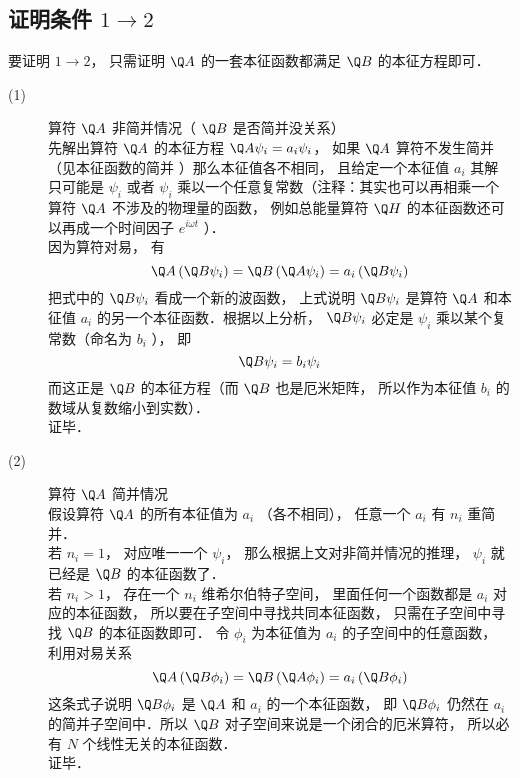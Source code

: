 \subsection{证明条件 $1 \to 2$}
要证明 $1 \to 2$，  只需证明 $\Q A$ 的一套本征函数都满足 $\Q B$ 的本征方程即可．
\begin{description}
  \item[(1)] 算符 $\Q A$ 非简并情况（ $\Q B$ 是否简并没关系）\\
  先解出算符 $\Q A$ 的本征方程 $\Q A{\psi _i} = {a_i}{\psi _i}$，  如果 $\Q A$ 算符不发生简并（见本征函数的简并%
  ）那么本征值各不相同， 且给定一个本征值 $a_i$ 其解只可能是 ${\psi _i}$ 或者 ${\psi _i}$ 乘以一个任意复常数（注释：其实也可以再相乘一个算符 $\Q A$ 不涉及的物理量的函数， 例如总能量算符 $\Q H$ 的本征函数还可以再成一个时间因子 ${e^{i\omega t}}$ ）．\\
  因为算符对易， 有
  \begin{equation}
    \Q A\left( {\Q B{\psi _i}} \right) = \Q B\left( {\Q A{\psi _i}} \right) = {a_i}\left( {\Q B{\psi _i}} \right)
  \end{equation}
  把式中的 $\Q B{\psi _i}$ 看成一个新的波函数， 上式说明 $\Q B{\psi _i}$ 是算符 $\Q A$ 和本征值 $a_i$ 的另一个本征函数．根据以上分析，  $\Q B{\psi _i}$ 必定是 ${\psi _i}$ 乘以某个复常数（命名为 $b_i$ ）， 即
  \begin{equation}
    \Q B{\psi _i} = {b_i}{\psi _i}
  \end{equation}
  而这正是 $\Q B$ 的本征方程（而 $\Q B$ 也是厄米矩阵， 所以作为本征值 $b_i$ 的数域从复数缩小到实数）．\\
  证毕．
  \item[(2)] 算符 $\Q A$ 简并情况\\
  假设算符 $\Q A$ 的所有本征值为 $a_i$ （各不相同）， 任意一个 $a_i$ 有 $n_i$ 重简并．\\
若 ${n_i} = 1$，  对应唯一一个 ${\psi _i}$，  那么根据上文对非简并情况的推理， ${\psi _i}$ 就已经是 $\Q B$ 的本征函数了．\\
若 ${n_i} > 1$，  存在一个 $n_i$ 维希尔伯特子空间， 里面任何一个函数都是 $a_i$ 对应的本征函数， 所以要在子空间中寻找共同本征函数， 只需在子空间中寻找 $\Q B$ 的本征函数即可． 令 ${\phi _i}$ 为本征值为 $a_i$ 的子空间中的任意函数， 利用对易关系
\begin{equation}
  \Q A\left( {\Q B{\phi _i}} \right) = \Q B\left( {\Q A{\phi _i}} \right) = {a_i}\left( {\Q B{\phi _i}} \right)
\end{equation}
这条式子说明 $\Q B{\phi _i}$ 是 $\Q A$ 和 $a_i$ 的一个本征函数， 即 $\Q B{\phi _i}$ 仍然在 $a_i$ 的简并子空间中．所以 $\Q B$ 对子空间来说是一个闭合的厄米算符， 所以必有 $N$ 个线性无关的本征函数．\\%
证毕．
\end{description}
